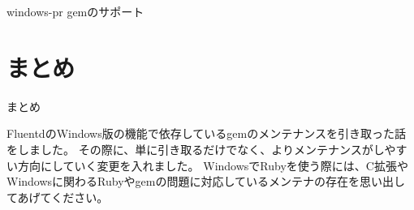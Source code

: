 \documentclass[12pt, unicode]{beamer}
\begin{document}
\begin{frame}{windows-pr gemのサポート}
  \Large {
  }
\end{frame}

\section[]{まとめ}
\begin{frame}{まとめ}
  \begin{block}{}
    FluentdのWindows版の機能で依存しているgemのメンテナンスを引き取った話をしました。\newline
    その際に、単に引き取るだけでなく、よりメンテナンスがしやすい方向にしていく変更を入れました。\newline
    WindowsでRubyを使う際には、C拡張やWindowsに関わるRubyやgemの問題に対応しているメンテナの存在を思い出してあげてください。
  \end{block}
\end{frame}
\end{document}
